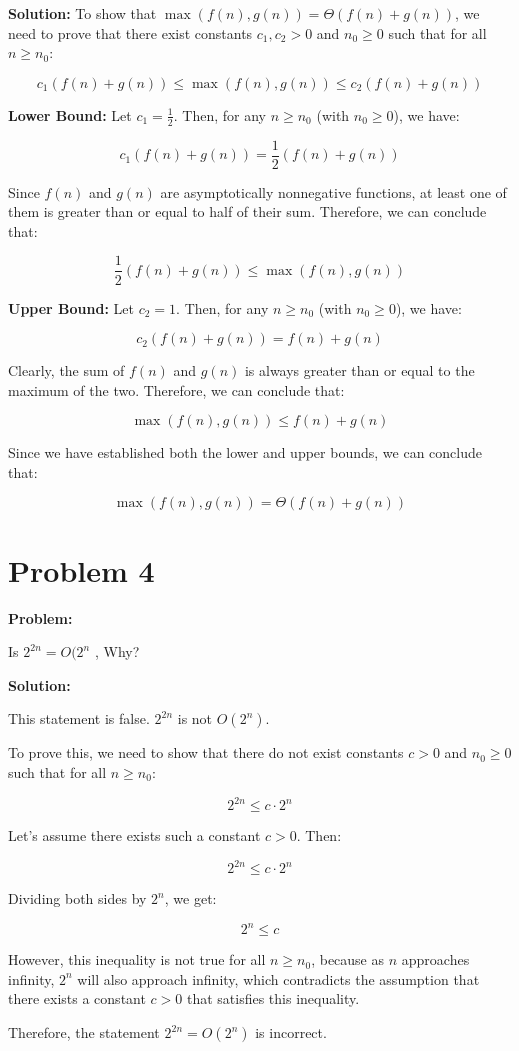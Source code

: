\documentclass[11pt]{article}
\begin{document}
    \textbf{Solution:}
    To show that $\max(f(n), g(n)) = \Theta(f(n) + g(n))$, we need to prove that there exist constants $c_1, c_2 > 0$ and $n_0 \geq 0$ such that for all $n \geq n_0$:

    \[
    c_1(f(n) + g(n)) \leq \max(f(n), g(n)) \leq c_2(f(n) + g(n))
    \]

    \textbf{Lower Bound:}
    Let $c_1 = \frac{1}{2}$. Then, for any $n \geq n_0$ (with $n_0 \geq 0$), we have:

    \[
    c_1(f(n) + g(n)) = \frac{1}{2}(f(n) + g(n))
    \]

    Since $f(n)$ and $g(n)$ are asymptotically nonnegative functions, at least one of them is greater than or equal to half of their sum. Therefore, we can conclude that:

    \[
    \frac{1}{2}(f(n) + g(n)) \leq \max(f(n), g(n))
    \]

    \textbf{Upper Bound:}
    Let $c_2 = 1$. Then, for any $n \geq n_0$ (with $n_0 \geq 0$), we have:

    \[
    c_2(f(n) + g(n)) = f(n) + g(n)
    \]

    Clearly, the sum of $f(n)$ and $g(n)$ is always greater than or equal to the maximum of the two. Therefore, we can conclude that:

    \[
    \max(f(n), g(n)) \leq f(n) + g(n)
    \]

    Since we have established both the lower and upper bounds, we can conclude that:

    \[
    \max(f(n), g(n)) = \Theta(f(n) + g(n))
    \]

    \section{Problem 4}

    \textbf{Problem:}

    Is $ 2^{2n} = O(2^{n}$ ,  Why?



    \textbf{Solution:}

    This statement is false. $2^{2n}$ is not $O(2^{n})$.

    To prove this, we need to show that there do not exist constants $c > 0$ and $n_0 \geq 0$ such that for all $n \geq n_0$:

    \[ 2^{2n} \leq c \cdot 2^{n} \]

    Let's assume there exists such a constant $c > 0$. Then:

    \[ 2^{2n} \leq c \cdot 2^{n} \]

    Dividing both sides by $2^n$, we get:

    \[ 2^n \leq c \]

    However, this inequality is not true for all $n \geq n_0$, because as $n$ approaches infinity, $2^n$ will also approach infinity, which contradicts the assumption that there exists a constant $c > 0$ that satisfies this inequality.

    Therefore, the statement $2^{2n} = O(2^{n})$ is incorrect.
\end{document}
